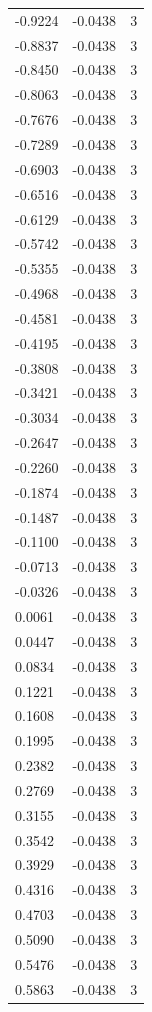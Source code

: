 \begin{longtable}{lrr}
  -0.9224 & -0.0438 & 3 \\
  -0.8837 & -0.0438 & 3 \\
  -0.8450 & -0.0438 & 3 \\
  -0.8063 & -0.0438 & 3 \\
  -0.7676 & -0.0438 & 3 \\
  -0.7289 & -0.0438 & 3 \\
  -0.6903 & -0.0438 & 3 \\
  -0.6516 & -0.0438 & 3 \\
  -0.6129 & -0.0438 & 3 \\
  -0.5742 & -0.0438 & 3 \\
  -0.5355 & -0.0438 & 3 \\
  -0.4968 & -0.0438 & 3 \\
  -0.4581 & -0.0438 & 3 \\
  -0.4195 & -0.0438 & 3 \\
  -0.3808 & -0.0438 & 3 \\
  -0.3421 & -0.0438 & 3 \\
  -0.3034 & -0.0438 & 3 \\
  -0.2647 & -0.0438 & 3 \\
  -0.2260 & -0.0438 & 3 \\
  -0.1874 & -0.0438 & 3 \\
  -0.1487 & -0.0438 & 3 \\
  -0.1100 & -0.0438 & 3 \\
  -0.0713 & -0.0438 & 3 \\
  -0.0326 & -0.0438 & 3 \\
  0.0061 & -0.0438 & 3 \\
  0.0447 & -0.0438 & 3 \\
  0.0834 & -0.0438 & 3 \\
  0.1221 & -0.0438 & 3 \\
  0.1608 & -0.0438 & 3 \\
  0.1995 & -0.0438 & 3 \\
  0.2382 & -0.0438 & 3 \\
  0.2769 & -0.0438 & 3 \\
  0.3155 & -0.0438 & 3 \\
  0.3542 & -0.0438 & 3 \\
  0.3929 & -0.0438 & 3 \\
  0.4316 & -0.0438 & 3 \\
  0.4703 & -0.0438 & 3 \\
  0.5090 & -0.0438 & 3 \\
  0.5476 & -0.0438 & 3 \\
  0.5863 & -0.0438 & 3 \\

\end{longtable}
